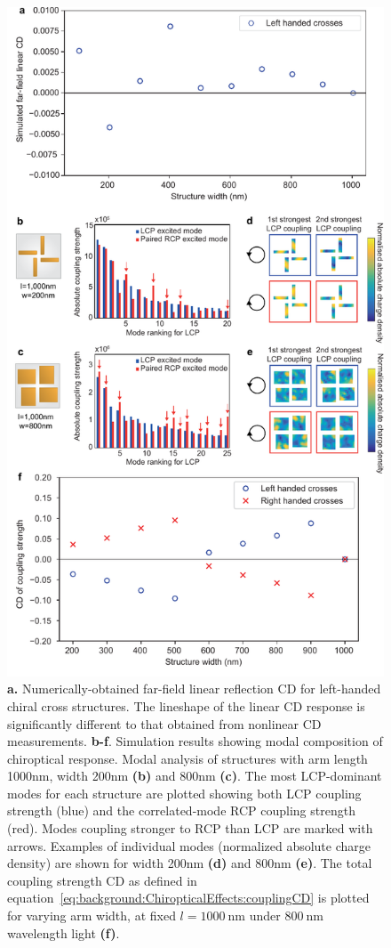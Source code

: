\begin{figure}[htb!]	
    \centering	
    \includegraphics[scale=0.8]{./figures/results/EnantiomorphingChiralCrosses/l1000modes.pdf}
    \caption{\label{fig:results:EnantiomorphingChiralCrosses:l1000modes}
    \textbf{a.} Numerically-obtained far-field linear reflection CD for left-handed chiral cross structures. The lineshape of the linear CD response is significantly different to that obtained from nonlinear CD measurements. \textbf{b-f}. Simulation results showing modal composition of chiroptical response. Modal analysis of structures with arm length 1000nm, width 200nm \textbf{(b)} and 800nm \textbf{(c)}. The most LCP-dominant modes for each structure are plotted showing both LCP coupling strength (blue) and the correlated-mode RCP coupling strength (red). Modes coupling stronger to RCP than LCP are marked with arrows. Examples of individual modes (normalized absolute charge density) are shown for width 200nm \textbf{(d)} and 800nm \textbf{(e)}. The total coupling strength CD as defined in equation~\ref{eq:background:ChiropticalEffects:couplingCD} is plotted for varying arm width, at fixed $l=\SI{1000}{\nano\m}$ under $\SI{800}{\nano\m}$ wavelength light \textbf{(f)}.}	

\end{figure}
